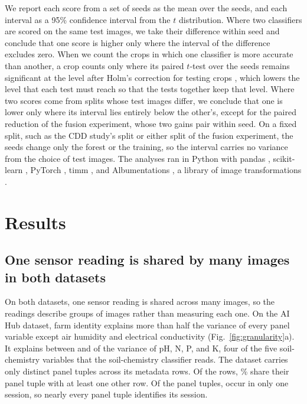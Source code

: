 \documentclass[preprint,12pt,authoryear,nopreprintline]{elsarticle}
\begin{document}
We report each score from a set of seeds as the mean over the seeds, and each
interval as a 95\% confidence interval from the $t$ distribution. Where two
classifiers are scored on the same test images, we take their difference within seed
and conclude that one score is higher only where the interval of the difference
excludes zero. When we count the crops in which one classifier is more accurate than
another, a crop counts only where its paired $t$-test over the seeds remains
significant at the \holmAlpha{} level after Holm's correction for testing
\timestampCrops{} crops \citep{holm1979simple}, which lowers the level that each test
must reach so that the tests together keep that level. Where two scores come from splits
whose test images differ, we conclude that one is lower only where its interval lies
entirely below the other's, except for the paired reduction of the fusion experiment,
whose two gains pair within seed. On a fixed split, such as the CDD study's split or either
split of the fusion experiment, the seeds change only the forest or the training, so
the interval carries no variance from the choice of test images. The analyses ran in
Python \pythonVersion{} with pandas \pandasVersion{}, scikit-learn \sklearnVersion{},
PyTorch \torchVersion{} \citep{paszke2019pytorch}, timm \timmVersion{}, and
Albumentations \albumentationsVersion{}, a library of image transformations
\citep{buslaev2020albumentations}.

\section{Results}
\label{sec:results}

\subsection{One sensor reading is shared by many images in both datasets}
\label{sec:res-diagnostic}

On both datasets, one sensor reading is shared across many images, so the readings
describe groups of images rather than measuring each one. On the AI Hub dataset,
farm identity explains more than half the variance of every panel variable except
air humidity and electrical conductivity (Fig.~\ref{fig:granularity}a). It explains
between \rsqFarmLo{} and \rsqFarmHi{} of the variance of pH, N, P, and K, four of the
five soil-chemistry variables that the soil-chemistry classifier reads. The dataset carries
only \numPanelTuples{} distinct panel tuples across its \numImages{} metadata rows. Of
the rows, \pctPanelTupleShared{}\% share their panel tuple with at least one other row.
Of the panel tuples, \numTuplesOneSession{} occur in only one session, so nearly every
panel tuple identifies its session.
\end{document}
